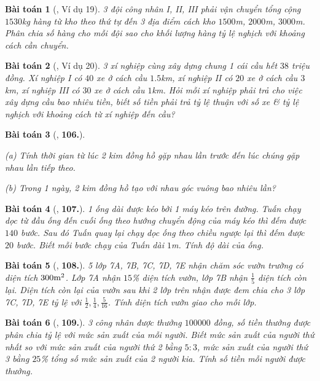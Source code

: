 \documentclass{article}
\numberwithin{equation}{section}
\newtheorem{baitoan}{Bài toán}[section]
\begin{document}
\begin{baitoan}[\cite{Binh_Toan_7_tap_1}, Ví dụ 19]
	3 đội công nhân I, II, III phải vận chuyển tổng cộng $1530$\emph{kg} hàng từ kho theo thứ tự đến 3 địa điểm cách kho $1500$\emph{m}, $2000$\emph{m}, $3000$\emph{m}. Phân chia số hàng cho mỗi đội sao cho khối lượng hàng tỷ lệ nghịch với khoảng cách cần chuyển.
\end{baitoan}

\begin{baitoan}[\cite{Binh_Toan_7_tap_1}, Ví dụ 20]
	3 xí nghiệp cùng xây dựng chung 1 cái cầu hết $38$ triệu đồng. Xí nghiệp I có $40$ xe ở cách cầu $1.5$\emph{km}, xí nghiệp II có $20$ xe ở cách cầu $3$\emph{km}, xí nghiệp III có $30$ xe ở cách cầu $1$\emph{km}. Hỏi mỗi xí nghiệp phải trả cho việc xây dựng cầu bao nhiêu tiền, biết số tiền phải trả tỷ lệ thuận với số xe \& tỷ lệ nghịch với khoảng cách từ xí nghiệp đến cầu?
\end{baitoan}

\begin{baitoan}[\cite{Binh_Toan_7_tap_1}, \textbf{106.}]
	\begin{enumerate*}
		\item[(a)] Tính thời gian từ lúc 2 kim đồng hồ gặp nhau lần trước đến lúc chúng gặp nhau lần tiếp theo.
		\item[(b)] Trong 1 ngày, 2 kim đồng hồ tạo với nhau góc vuông bao nhiêu lần?
	\end{enumerate*}
\end{baitoan}

\begin{baitoan}[\cite{Binh_Toan_7_tap_1}, \textbf{107.}]
	1 ống dài được kéo bởi 1 máy kéo trên đường. Tuấn chạy dọc từ đầu ống đến cuối ống theo hướng chuyển động của máy kéo thì đếm được $140$ bước. Sau đó Tuấn quay lại chạy dọc ống theo chiều ngược lại thì đếm được $20$ bước. Biết mỗi bước chạy của Tuấn dài $1$\emph{m}. Tính độ dài của ống.
\end{baitoan}

\begin{baitoan}[\cite{Binh_Toan_7_tap_1}, \textbf{108.}]
	5 lớp 7A, 7B, 7C, 7D, 7E nhận chăm sóc vườn trường có diện tích $300\rm m^2$. Lớp 7A nhận $15$\% diện tích vườn, lớp 7B nhận $\frac{1}{5}$ diện tích còn lại. Diện tích còn lại của vườn sau khi 2 lớp trên nhận được đem chia cho 3 lớp 7C, 7D, 7E tỷ lệ với $\frac{1}{2},\frac{1}{4},\frac{5}{16}$. Tính diện tích vườn giao cho mỗi lớp.
\end{baitoan}

\begin{baitoan}[\cite{Binh_Toan_7_tap_1}, \textbf{109.}]
	3 công nhân được thưởng $100000$ đồng, số tiền thưởng được phân chia tỷ lệ với mức sản xuất của mỗi người. Biết mức sản xuất của người thứ nhất so với mức sản xuất của người thứ 2 bằng $5:3$, mức sản xuất của người thứ 3 bằng $25$\% tổng số mức sản xuất của 2 người kia. Tính số tiền mỗi người được thưởng.
\end{baitoan}
\end{document}
